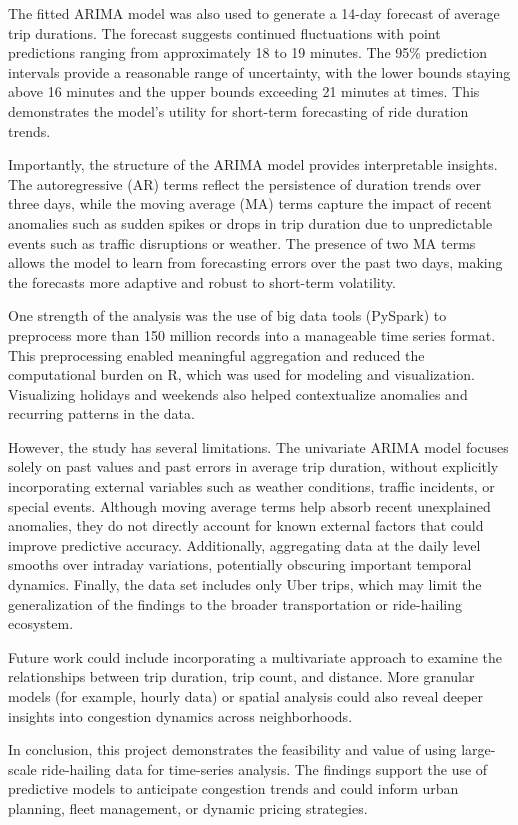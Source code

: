 \documentclass{article}
\begin{document}
The fitted ARIMA model was also used to generate a 14-day forecast of average trip durations. The forecast suggests continued fluctuations with point predictions ranging from approximately 18 to 19 minutes. The 95\% prediction intervals provide a reasonable range of uncertainty, with the lower bounds staying above 16 minutes and the upper bounds exceeding 21 minutes at times. This demonstrates the model's utility for short-term forecasting of ride duration trends.

Importantly, the structure of the ARIMA model provides interpretable insights. The autoregressive (AR) terms reflect the persistence of duration trends over three days, while the moving average (MA) terms capture the impact of recent anomalies such as sudden spikes or drops in trip duration due to unpredictable events such as traffic disruptions or weather. The presence of two MA terms allows the model to learn from forecasting errors over the past two days, making the forecasts more adaptive and robust to short-term volatility.

One strength of the analysis was the use of big data tools (PySpark) to preprocess more than 150 million records into a manageable time series format. This preprocessing enabled meaningful aggregation and reduced the computational burden on R, which was used for modeling and visualization. Visualizing holidays and weekends also helped contextualize anomalies and recurring patterns in the data.

However, the study has several limitations. The univariate ARIMA model focuses solely on past values and past errors in average trip duration, without explicitly incorporating external variables such as weather conditions, traffic incidents, or special events. Although moving average terms help absorb recent unexplained anomalies, they do not directly account for known external factors that could improve predictive accuracy. Additionally, aggregating data at the daily level smooths over intraday variations, potentially obscuring important temporal dynamics. Finally, the data set includes only Uber trips, which may limit the generalization of the findings to the broader transportation or ride-hailing ecosystem.

Future work could include incorporating a multivariate approach to examine the relationships between trip duration, trip count, and distance. More granular models (for example, hourly data) or spatial analysis could also reveal deeper insights into congestion dynamics across neighborhoods.

In conclusion, this project demonstrates the feasibility and value of using large-scale ride-hailing data for time-series analysis. The findings support the use of predictive models to anticipate congestion trends and could inform urban planning, fleet management, or dynamic pricing strategies.





\end{document}
